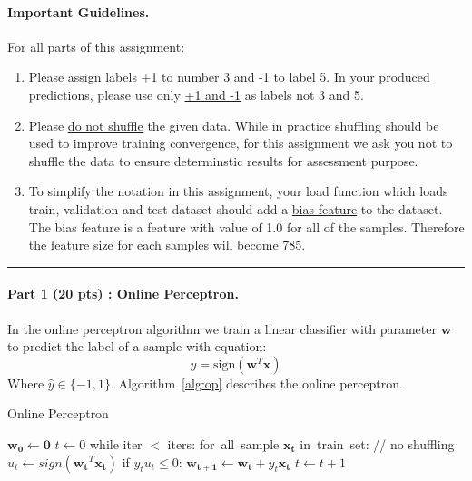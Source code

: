 \documentclass{article}
\begin{document}
{\paragraph{Important Guidelines.} {For all parts of this assignment:
\begin{enumerate}
\item Please assign labels +1 to number 3 and -1 to label 5. In your produced predictions, please use only \underline{+1 and -1} as labels not 3 and 5.
\item Please \underline{do not shuffle} the given data. While in practice shuffling should be used to improve training convergence, for this assignment we ask you not to shuffle the data to ensure determinstic results for assessment purpose.
\item To simplify the notation in this assignment, your load function which loads train, validation and test dataset should add a \underline{bias feature} to the dataset. The bias feature is a feature with value of 1.0 for all of the samples. Therefore the feature size for each samples will become 785.
\end{enumerate}
}
\noindent\rule{16cm}{0.4pt}
\paragraph{Part 1 (20 pts) : Online Perceptron.} In the online perceptron algorithm we train a linear classifier with parameter $\bm{w}$ to predict the label of a sample with equation:
\begin{equation}
\hat{y} = \mbox{sign}(\bm{w}^{T}\bm{x})
\label{eqpredict}
\end{equation} 
Where $\hat{y} \in \{-1,1\}$. Algorithm~\ref{alg:op} describes the online perceptron.\\
\begin{algorithm}[H]
\caption{Online Perceptron}\label{alg:op}
\begin{algorithmic}[1]
\State $\bm{w_0} \gets \bm{0}$
\State $t \gets 0$
\State while iter $<$ iters:
\State \hspace{10mm} \mbox{for all sample} $\bm{x_t}$ \mbox{in train set}: // no shuffling
\State \hspace{15mm} $u_t \gets sign(\bm{w_t}^{T} \bm{x_t})$
\State \hspace{15mm} if $y_t u_t \leq 0$:
\State \hspace{20mm} $\bm{w_{t+1}} \gets \bm{w_t} + y_t \bm{x_t}$
\State \hspace{20mm} $t \gets t + 1$
\EndProcedure
\end{algorithmic}
\end{algorithm}

}
\end{document}
